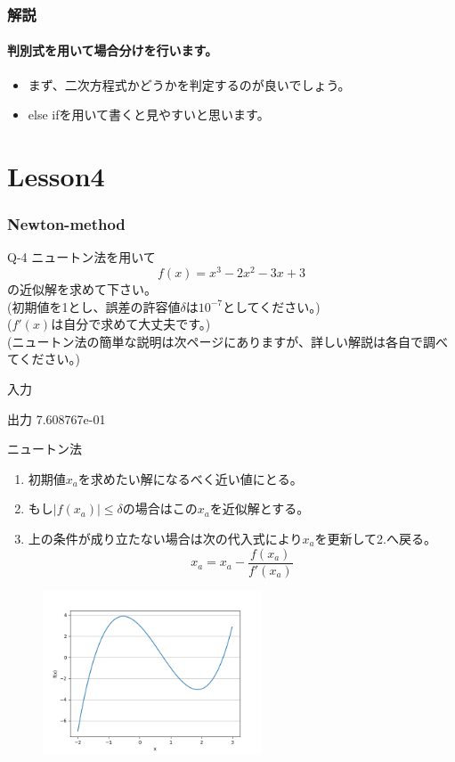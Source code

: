 \documentclass[dvipdfmx]{beamer}
\begin{document}
\begin{frame}
	\frametitle{解説}
	\framesubtitle{判別式を用いて場合分けを行います。}
	\begin{itemize}
		\item まず、二次方程式かどうかを判定するのが良いでしょう。
		\item else ifを用いて書くと見やすいと思います。
	\end{itemize}
\end{frame}

\section{Lesson4}
\begin{frame}
	\frametitle{Newton-method}
	\begin{itembox}[l]{Q-4}
		ニュートン法を用いて
		$$f(x) = x^3-2x^2-3x+3$$
		の近似解を求めて下さい。\\
		(初期値を1とし、誤差の許容値$\delta$は$10^{-7}$としてください。)\\
		($f'(x)$は自分で求めて大丈夫です。)\\
		(ニュートン法の簡単な説明は次ページにありますが、詳しい解説は各自で調べてください。)
	\end{itembox}
	\begin{block}{入力}		
	\end{block}
	\begin{block}{出力}
		7.608767e-01
	\end{block}
\end{frame}

\begin{frame}
	\begin{itembox}[l]{ニュートン法}
		\begin{enumerate}
			\item 初期値$x_a$を求めたい解になるべく近い値にとる。
			\item もし$\left\lvert f(x_a) \right\lvert \leq \delta $の場合はこの$x_a$を近似解とする。
			\item 上の条件が成り立たない場合は次の代入式により$x_a$を更新して2.へ戻る。
				$$x_a = x_a - \frac{f(x_a)}{f'(x_a)}$$
		\end{enumerate}
	\end{itembox}
	\begin{figure}[h]
		\includegraphics[width=65mm]{Figure_1.png}
	\end{figure}
\end{frame}
\end{document}
